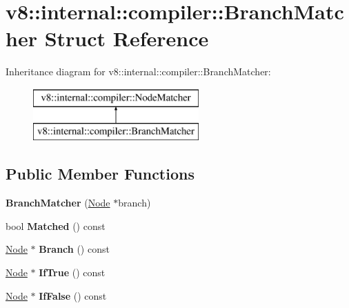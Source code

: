 \hypertarget{structv8_1_1internal_1_1compiler_1_1_branch_matcher}{}\section{v8\+:\+:internal\+:\+:compiler\+:\+:Branch\+Matcher Struct Reference}
\label{structv8_1_1internal_1_1compiler_1_1_branch_matcher}
Inheritance diagram for v8\+:\+:internal\+:\+:compiler\+:\+:Branch\+Matcher\+:\begin{figure}[H]
\begin{center}
\leavevmode
\includegraphics[height=2.000000cm]{structv8_1_1internal_1_1compiler_1_1_branch_matcher}
\end{center}
\end{figure}
\subsection*{Public Member Functions}
\begin{DoxyCompactItemize}
\item 
{\bfseries Branch\+Matcher} (\hyperlink{classv8_1_1internal_1_1compiler_1_1_node}{Node} $\ast$branch)\hypertarget{structv8_1_1internal_1_1compiler_1_1_branch_matcher_a727f6b48e01f651aa02f423ab122ffde}{}\label{structv8_1_1internal_1_1compiler_1_1_branch_matcher_a727f6b48e01f651aa02f423ab122ffde}

\item 
bool {\bfseries Matched} () const \hypertarget{structv8_1_1internal_1_1compiler_1_1_branch_matcher_ac0a30e2ff9051dea3520ddea18727b0b}{}\label{structv8_1_1internal_1_1compiler_1_1_branch_matcher_ac0a30e2ff9051dea3520ddea18727b0b}

\item 
\hyperlink{classv8_1_1internal_1_1compiler_1_1_node}{Node} $\ast$ {\bfseries Branch} () const \hypertarget{structv8_1_1internal_1_1compiler_1_1_branch_matcher_a819e44f4d6c62562fb3421d1674f78fe}{}\label{structv8_1_1internal_1_1compiler_1_1_branch_matcher_a819e44f4d6c62562fb3421d1674f78fe}

\item 
\hyperlink{classv8_1_1internal_1_1compiler_1_1_node}{Node} $\ast$ {\bfseries If\+True} () const \hypertarget{structv8_1_1internal_1_1compiler_1_1_branch_matcher_ae9e63f136977996af15945cd7ea068e8}{}\label{structv8_1_1internal_1_1compiler_1_1_branch_matcher_ae9e63f136977996af15945cd7ea068e8}

\item 
\hyperlink{classv8_1_1internal_1_1compiler_1_1_node}{Node} $\ast$ {\bfseries If\+False} () const \hypertarget{structv8_1_1internal_1_1compiler_1_1_branch_matcher_a71a3c44e06c28ca4c8176383a6a305fb}{}\label{structv8_1_1internal_1_1compiler_1_1_branch_matcher_a71a3c44e06c28ca4c8176383a6a305fb}

\end{DoxyCompactItemize}
